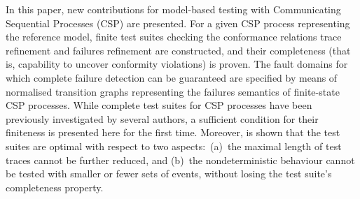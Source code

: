 In this paper,   new contributions for model-based testing with
Communicating Sequential Processes (CSP) are presented. For a given CSP
process representing the reference model, finite test suites checking the
conformance relations trace refinement and failures refinement are constructed, and
their   completeness (that is, capability to uncover conformity
violations) is proven. The fault domains for which complete failure detection can be guaranteed
are specified by means of normalised transition graphs representing the failures semantics of finite-state CSP processes.
While complete test suites for CSP processes have been
previously investigated by several authors, a sufficient condition for their
finiteness is presented here for the first time. 
Moreover, is shown that the test suites are optimal with respect to two
aspects:~(a)~the maximal length of test traces cannot be further reduced, and (b)~the
nondeterministic behaviour cannot be tested with smaller or fewer sets of
events, without losing the test suite's completeness property.
